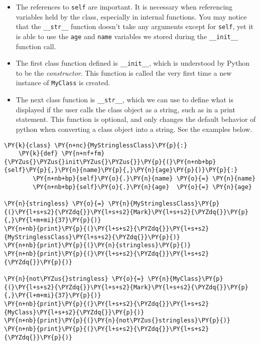 \begin{itemize}
\tightlist
\item
  The references to \texttt{self} are important. It is necessary when
  referencing variables held by the class, especially in internal
  functions. You may notice that the \texttt{\_\_str\_\_} function
  doesn't take any arguments except for \texttt{self}, yet it is able to
  use the \texttt{age} and \texttt{name} variables we stored during the
  \texttt{\_\_init\_\_} function call.
\item
  The first class function defined is \texttt{\_\_init\_\_}, which is
  understood by Python to be the \emph{constructor}. This function is
  called the very first time a new instance of \texttt{MyClass} is
  created.
\item
  The next class function is \texttt{\_\_str\_\_}, which we can use to
  define what is displayed if the user calls the class object as a
  string, such as in a print statement. This function is optional, and
  only changes the default behavior of python when converting a class
  object into a string. See the examples below.
\end{itemize}

    \begin{tcolorbox}[breakable, size=fbox, boxrule=1pt, pad at break*=1mm,colback=cellbackground, colframe=cellborder]
\begin{Verbatim}[commandchars=\\\{\}]
\PY{k}{class} \PY{n+nc}{MyStringlessClass}\PY{p}{:}
    \PY{k}{def} \PY{n+nf+fm}{\PYZus{}\PYZus{}init\PYZus{}\PYZus{}}\PY{p}{(}\PY{n+nb+bp}{self}\PY{p}{,}\PY{n}{name}\PY{p}{,}\PY{n}{age}\PY{p}{)}\PY{p}{:}
        \PY{n+nb+bp}{self}\PY{o}{.}\PY{n}{name} \PY{o}{=} \PY{n}{name}
        \PY{n+nb+bp}{self}\PY{o}{.}\PY{n}{age}  \PY{o}{=} \PY{n}{age}

\PY{n}{stringless} \PY{o}{=} \PY{n}{MyStringlessClass}\PY{p}{(}\PY{l+s+s2}{\PYZdq{}}\PY{l+s+s2}{Mark}\PY{l+s+s2}{\PYZdq{}}\PY{p}{,}\PY{l+m+mi}{37}\PY{p}{)}
\PY{n+nb}{print}\PY{p}{(}\PY{l+s+s2}{\PYZdq{}}\PY{l+s+s2}{MyStringlessClass}\PY{l+s+s2}{\PYZdq{}}\PY{p}{)}
\PY{n+nb}{print}\PY{p}{(}\PY{n}{stringless}\PY{p}{)}
\PY{n+nb}{print}\PY{p}{(}\PY{l+s+s2}{\PYZdq{}}\PY{l+s+s2}{\PYZdq{}}\PY{p}{)}

\PY{n}{not\PYZus{}stringless} \PY{o}{=} \PY{n}{MyClass}\PY{p}{(}\PY{l+s+s2}{\PYZdq{}}\PY{l+s+s2}{Mark}\PY{l+s+s2}{\PYZdq{}}\PY{p}{,}\PY{l+m+mi}{37}\PY{p}{)}
\PY{n+nb}{print}\PY{p}{(}\PY{l+s+s2}{\PYZdq{}}\PY{l+s+s2}{MyClass}\PY{l+s+s2}{\PYZdq{}}\PY{p}{)}
\PY{n+nb}{print}\PY{p}{(}\PY{n}{not\PYZus{}stringless}\PY{p}{)}
\PY{n+nb}{print}\PY{p}{(}\PY{l+s+s2}{\PYZdq{}}\PY{l+s+s2}{\PYZdq{}}\PY{p}{)}
\end{Verbatim}
\end{tcolorbox}

